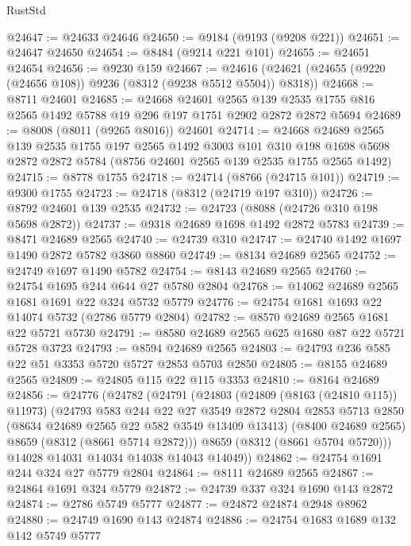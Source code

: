 \begin{lexlean}{RustStd}
\begin{coremodule}
@24647 := @24633 @24646
@24650 := @9184 (@9193 (@9208 @221))
@24651 := @24647 @24650
@24654 := @8484 (@9214 @221 @101)
@24655 := @24651 @24654
@24656 := @9230 @159
@24667 := @24616 (@24621 (@24655 (@9220 (@24656 @108)) @9236 (@8312 (@9238 @5512 @5504)) @8318))
@24668 := @8711 @24601
@24685 := @24668
    @24601
    @2565
    @139
    @2535
    @1755
    @816
    @2565
    @1492
    @5788
    @19
    @296
    @197
    @1751
    @2902
    @2872
    @2872
    @5694
@24689 := @8008 (@8011 (@9265 @8016)) @24601
@24714 := @24668
    @24689
    @2565
    @139
    @2535
    @1755
    @197
    @2565
    @1492
    @3003
    @101
    @310
    @198
    @1698
    @5698
    @2872
    @2872
    @5784
    (@8756 @24601 @2565 @139 @2535 @1755 @2565 @1492)
@24715 := @8778 @1755
@24718 := @24714 (@8766 (@24715 @101))
@24719 := @9300 @1755
@24723 := @24718 (@8312 (@24719 @197 @310))
@24726 := @8792 @24601 @139 @2535
@24732 := @24723 (@8088 (@24726 @310 @198 @5698 @2872))
@24737 := @9318 @24689 @1698 @1492 @2872 @5783
@24739 := @8471 @24689 @2565
@24740 := @24739 @310
@24747 := @24740 @1492 @1697 @1490 @2872 @5782 @3860 @8860
@24749 := @8134 @24689 @2565
@24752 := @24749 @1697 @1490 @5782
@24754 := @8143 @24689 @2565
@24760 := @24754 @1695 @244 @644 @27 @5780 @2804
@24768 := @14062 @24689 @2565 @1681 @1691 @22 @324 @5732 @5779
@24776 := @24754 @1681 @1693 @22 @14074 @5732 (@2786 @5779 @2804)
@24782 := @8570 @24689 @2565 @1681 @22 @5721 @5730
@24791 := @8580 @24689 @2565 @625 @1680 @87 @22 @5721 @5728 @3723
@24793 := @8594 @24689 @2565
@24803 := @24793 @236 @585 @22 @51 @3353 @5720 @5727 @2853 @5703 @2850
@24805 := @8155 @24689 @2565
@24809 := @24805 @115 @22 @115 @3353
@24810 := @8164 @24689
@24856 := @24776
    (@24782
      (@24791
        (@24803
          (@24809 (@8163 (@24810 @115)) @11973)
          (@24793
            @583
            @244
            @22
            @27
            @3549
            @2872
            @2804
            @2853
            @5713
            @2850
            (@8634 @24689 @2565 @22 @582 @3549 @13409 @13413)
            (@8400 @24689 @2565)
            @8659
            (@8312 (@8661 @5714 @2872)))
          @8659
          (@8312 (@8661 @5704 @5720)))
        @14028
        @14031
        @14034
        @14038
        @14043
        @14049))
@24862 := @24754 @1691 @244 @324 @27 @5779 @2804
@24864 := @8111 @24689 @2565
@24867 := @24864 @1691 @324 @5779
@24872 := @24739 @337 @324 @1690 @143 @2872
@24874 := @2786 @5749 @5777
@24877 := @24872 @24874 @2948 @8962
@24880 := @24749 @1690 @143 @24874
@24886 := @24754 @1683 @1689 @132 @142 @5749 @5777

\end{coremodule}
\end{lexlean}
